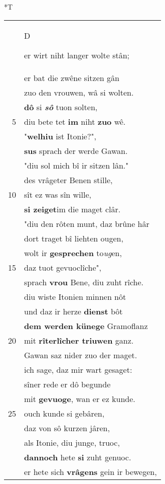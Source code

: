 \documentclass[8pt,a4paper,notitlepage]{article}
\begin{document}
\begin{table}[ht]
\begin{minipage}[t]{0.5\linewidth}
\small
\begin{center}*T
\end{center}
\begin{tabular}{rl}
 & \begin{large}D\end{large}er wirt niht langer wolte stân;\\ 
 & er bat die zwêne sitzen gân\\ 
 & zuo den vrouwen, wâ si wolten.\\ 
 & \textbf{dô} si \textit{\textbf{sô}} tuon solten,\\ 
5 & diu bete tet \textbf{im} niht \textbf{zuo} wê.\\ 
 & "\textbf{welhiu} ist Itonie?",\\ 
 & \textbf{sus} sprach der werde Gawan.\\ 
 & "diu sol mich bî ir sitzen lân."\\ 
 & des vrâgeter Benen stille,\\ 
10 & sît ez was sîn wille,\\ 
 & \textbf{si zeiget}im die maget clâr.\\ 
 & "diu den rôten munt, daz brûne hâr\\ 
 & dort traget bî liehten ougen,\\ 
 & wolt ir \textbf{gesprechen} to\textit{ug}en,\\ 
15 & daz tuot gevuoclîche",\\ 
 & sprach \textbf{vrou} Bene, diu zuht rîche.\\ 
 & diu wiste Itonien minnen nôt\\ 
 & und daz ir herze \textbf{dienst} bôt\\ 
 & \textbf{dem werden künege} Gramoflanz\\ 
20 & mit \textbf{rîterlîcher triuwen} ganz.\\ 
 & Gawan saz nider zuo der maget.\\ 
 & ich sage, daz mir wart gesaget:\\ 
 & sîner rede er dô begunde\\ 
 & mit \textbf{gevuoge}, wan er ez kunde.\\ 
25 & ouch kunde si gebâren,\\ 
 & daz von sô kurzen jâren,\\ 
 & als Itonie, diu junge, truoc,\\ 
 & \textbf{dannoch} hete \textbf{si} zuht genuoc.\\ 
 & er hete sich \textbf{vrâgens} gein ir bewegen,\\ 

\end{tabular}
\end{minipage}
\end{table}
\end{document}
